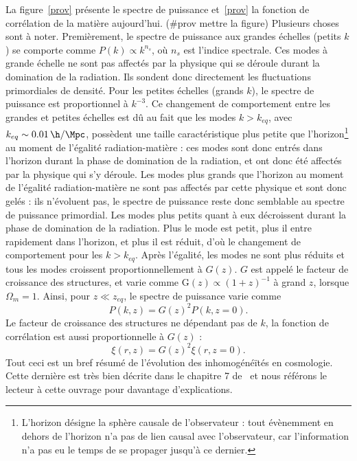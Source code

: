 \documentclass[11pt, twoside, a4paper, openright]{report}
\begin{document}
La figure~\ref{prov} présente le spectre de puissance et~\ref{prov} la fonction de corrélation de la matière aujourd'hui. (\#prov mettre la figure)
Plusieurs choses sont à noter. Premièrement, le spectre de puissance aux grandes échelles (petits $k$) se comporte comme $P(k) \propto k^{n_s}$, où $n_s$ est l'indice spectrale.
Ces modes à grande échelle ne sont pas affectés par la physique qui se déroule durant la domination de la radiation. Ils sondent donc directement les fluctuations primordiales de densité.
Pour les petites échelles (grands $k$), le spectre de puissance est proportionnel à $k^{-3}$. Ce changement de comportement entre les grandes et petites échelles est dû au fait que les modes $k > k_{eq}$, avec  $k_{eq} \sim \SI{0.01}{\h\per\Mpc}$, possèdent une taille caractéristique plus petite que l'horizon\footnote{L'horizon désigne la sphère causale de l'observateur : tout évènemment en dehors de l'horizon n'a pas de lien causal avec l'observateur, car l'information n'a pas eu le temps de se propager jusqu'à ce dernier.} au moment de l'égalité radiation-matière : ces modes sont donc entrés dans l'horizon durant la phase de domination de la radiation, et ont donc été affectés par la physique qui s'y déroule.
Les modes plus grands que l'horizon au moment de l'égalité radiation-matière ne sont pas affectés par cette physique et sont donc gelés : ils n'évoluent pas, le spectre de puissance reste donc semblable au spectre de puissance primordial.
Les modes plus petits quant à eux décroissent durant la phase de domination de la radiation. Plus le mode est petit, plus il entre rapidement dans l'horizon, et plus il est réduit, d'où le changement de comportement pour les $k > k_{eq}$. Après l'égalité, les modes ne sont plus réduits et tous les modes croissent proportionnellement à $G(z)$. 
$G$ est appelé le facteur de croissance des structures, et varie comme $\mathrm{G}(z) \propto (1+z)^{-1}$ à grand $z$, lorsque $\Omega_m = 1$. Ainsi, pour $z \ll z_{eq}$, le spectre de puissance varie comme
\begin{equation}
  \label{eq:pow_spec_vs_z}
  P(k,z) = G(z)^{2} P(k,z=0) .
\end{equation}
Le facteur de croissance des structures ne dépendant pas de $k$, la fonction de corrélation est aussi proportionnelle à $G(z)$ :
\begin{equation}
  \label{eq:cf_vs_z}
  \xi(r, z) = G(z)^{2} \xi(r, z=0).
\end{equation}
Tout ceci est un bref résumé de l'évolution des inhomogénéïtés en cosmologie. Cette dernière est très bien décrite dans le chapitre 7 de~\cite{Dodelson2003} et nous référons le lecteur à cette ouvrage pour davantage d'explications.
\end{document}
